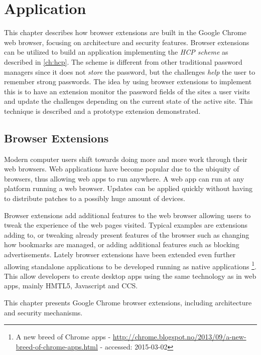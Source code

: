 \chapter{Application}\label{app}
This chapter describes how browser extensions are built in the Google Chrome web browser, focusing on architecture and security features. Browser extensions can be utilized to build an application implementing the \emph{HCP scheme} as described in \autoref{ch:hcp}. The scheme is different from other traditional password managers since it does not \emph{store} the password, but the challenges \emph{help} the user to remember strong passwords. The idea by using browser extensions to implement this is to have an extension monitor the password fields of the sites a user visits and update the challenges depending on the current state of the active site. This technique is described and a prototype extension demonstrated. 
\section{Browser Extensions}\label{browser-extensions}
Modern computer users shift towards doing more and more work through their web browsers. Web applications have become popular due to the ubiquity of browsers, thus allowing web apps to run anywhere. A web app can run at any platform running a web browser. Updates can be applied quickly without having to distribute patches to a possibly huge amount of devices.
\par Browser extensions add additional features to the web browser allowing users to tweak the experience of the web pages visited. Typical examples are extensions adding to, or tweaking already present features of the browser such as changing how bookmarks are managed, or adding additional features such as blocking advertisements. Lately browser extensions have been extended even further allowing standalone applications to be developed running as native applications \footnote{A new breed of Chrome apps - \url{http://chrome.blogspot.no/2013/09/a-new-breed-of-chrome-apps.html} - accessed: 2015-03-02}. This allow developers to create desktop apps using the same technology as in web apps, mainly HMTL5, Javascript and CCS.
\par This chapter presents Google Chrome browser extensions, including architecture and security mechanisms.


